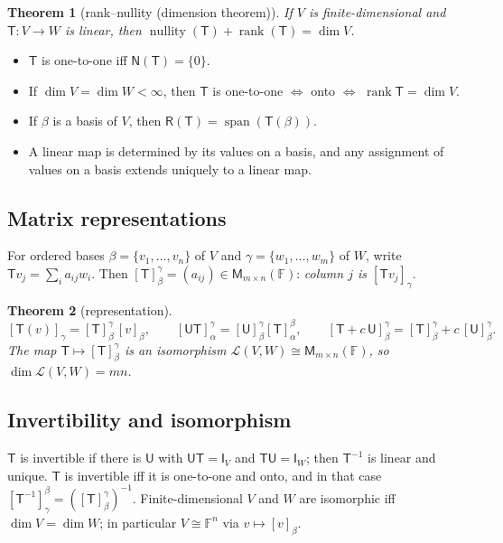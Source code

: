 \documentclass[12pt]{article}
\newtheorem{theorem}{Theorem}[section]
\theoremstyle{definition}
\theoremstyle{remark}
\newcommand{\F}{\mathbb{F}}
\newcommand{\N}{\mathsf{N}}
\newcommand{\Rg}{\mathsf{R}}
\newcommand{\Lin}{\mathcal{L}}
\newcommand{\M}{\mathsf{M}}
\newcommand{\T}{\mathsf{T}}
\newcommand{\U}{\mathsf{U}}
\newcommand{\I}{\mathsf{I}}
\DeclareMathOperator{\spn}{span}
\DeclareMathOperator{\rank}{rank}
\DeclareMathOperator{\nullity}{nullity}
\begin{document}
\begin{theorem}[rank–nullity (dimension theorem)]
If $V$ is finite-dimensional and $\T\colon V\to W$ is linear, then $\nullity(\T)+\rank(\T)=\dim V$.
\end{theorem}

\begin{itemize}
  \item $\T$ is one-to-one iff $\N(\T)=\{0\}$.
  \item If $\dim V=\dim W<\infty$, then $\T$ is one-to-one $\iff$ onto $\iff$ $\rank\T=\dim V$.
  \item If $\beta$ is a basis of $V$, then $\Rg(\T)=\spn(\T(\beta))$.
  \item A linear map is determined by its values on a basis, and any assignment of values on a basis extends uniquely to a linear map.
\end{itemize}

\subsection{Matrix representations}
For ordered bases $\beta=\{v_1,\dots,v_n\}$ of $V$ and $\gamma=\{w_1,\dots,w_m\}$ of $W$, write $\T v_j=\sum_i a_{ij}w_i$.
Then $[\T]_\beta^\gamma=(a_{ij})\in\M_{m\times n}(\F)$: \emph{column $j$ is $[\T v_j]_\gamma$}.

\begin{theorem}[representation]
\[
[\T(v)]_\gamma=[\T]_\beta^\gamma\,[v]_\beta,\qquad
[\U\T]_\alpha^\gamma=[\U]_\beta^\gamma[\T]_\alpha^\beta,\qquad
[\T+c\,\U]_\beta^\gamma=[\T]_\beta^\gamma+c\,[\U]_\beta^\gamma .
\]
The map $\T\mapsto[\T]_\beta^\gamma$ is an isomorphism $\Lin(V,W)\cong\M_{m\times n}(\F)$, so $\dim\Lin(V,W)=mn$.
\end{theorem}

\subsection{Invertibility and isomorphism}
$\T$ is invertible if there is $\U$ with $\U\T=\I_V$ and $\T\U=\I_W$; then $\T^{-1}$ is linear and unique.
$\T$ is invertible iff it is one-to-one and onto, and in that case $[\T^{-1}]_\gamma^\beta=([\T]_\beta^\gamma)^{-1}$.
Finite-dimensional $V$ and $W$ are isomorphic iff $\dim V=\dim W$; in particular $V\cong\F^n$ via $v\mapsto[v]_\beta$.
\end{document}
